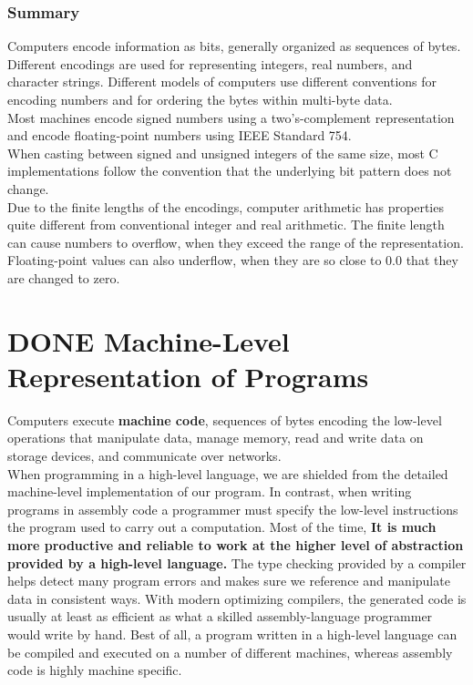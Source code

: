\documentclass[11pt]{article}
\begin{document}
\subsubsection{Summary}
\label{sec:org4b06fcb}
Computers encode information as bits, generally organized as sequences of bytes. Different encodings are used for representing integers, real numbers, and character strings. Different models of computers use different conventions for encoding numbers and for ordering the bytes within multi-byte data.\\

Most machines encode signed numbers using a two’s-complement representation and encode floating-point numbers using IEEE Standard 754.\\

When casting between signed and unsigned integers of the same size, most C implementations follow the convention that the underlying bit pattern does not change.\\

Due to the finite lengths of the encodings, computer arithmetic has properties quite different from conventional integer and real arithmetic. The finite length can cause numbers to overflow, when they exceed the range of the representation. Floating-point values can also underflow, when they are so close to 0.0 that they are changed to zero.\\


\section{{\bfseries\sffamily DONE} Machine-Level Representation of Programs}
\label{sec:orgc0e3d76}
Computers execute \textbf{machine code}, sequences of bytes encoding the low-level operations that manipulate data, manage memory, read and write data on storage devices, and communicate over networks.\\

When programming in a high-level language, we are shielded from the detailed machine-level implementation of our program. In contrast, when writing programs in assembly code a programmer must specify the low-level instructions the program used to carry out a computation. Most of the time, \textbf{It is much more productive and reliable to work at the higher level of abstraction provided by a high-level language.} The type checking provided by a compiler helps detect many program errors and makes sure we reference and manipulate data in consistent ways. With modern optimizing compilers, the generated code is usually at least as efficient as what a skilled assembly-language programmer would write by hand. Best of all, a program written in a high-level language can be compiled and executed on a number of different machines, whereas assembly code is highly machine specific.\\
\end{document}
